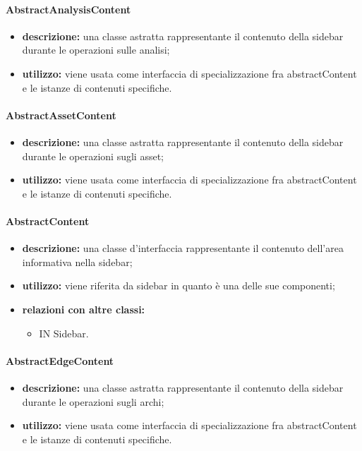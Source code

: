 \paragraph{AbstractAnalysisContent}
\begin{itemize}
	\item \textbf{descrizione:} una classe astratta rappresentante il contenuto della sidebar durante le operazioni sulle analisi;
	\item \textbf{utilizzo:} viene usata come interfaccia di specializzazione fra abstractContent e le istanze di contenuti specifiche.
\end{itemize}
\paragraph{AbstractAssetContent}
\begin{itemize}
	\item \textbf{descrizione:} una classe astratta rappresentante il contenuto della sidebar durante le operazioni sugli asset;
	\item \textbf{utilizzo:} viene usata come interfaccia di specializzazione fra abstractContent e le istanze di contenuti specifiche.
\end{itemize}
\paragraph{AbstractContent}
\begin{itemize}
	\item \textbf{descrizione:} una classe d'interfaccia rappresentante il contenuto dell'area informativa nella sidebar;
	\item \textbf{utilizzo:} viene riferita da sidebar in quanto è una delle sue componenti;
	\item \textbf{relazioni con altre classi:} 
	\begin{itemize}
		\item IN Sidebar.
	\end{itemize}
\end{itemize}
\paragraph{AbstractEdgeContent}
\begin{itemize}
	\item \textbf{descrizione:} una classe astratta rappresentante il contenuto della sidebar durante le operazioni sugli archi;
	\item \textbf{utilizzo:} viene usata come interfaccia di specializzazione fra abstractContent e le istanze di contenuti specifiche.
\end{itemize}
